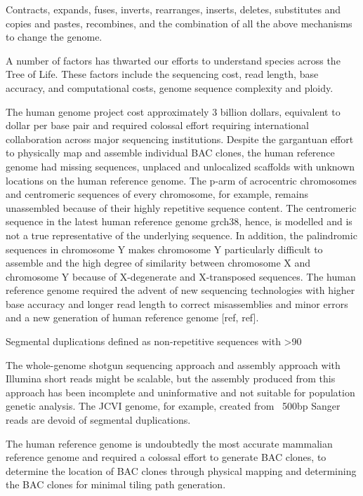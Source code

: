 Contracts, expands, fuses, inverts, rearranges, inserts, deletes, substitutes and copies and pastes, recombines, and the combination of all the above mechanisms to change the genome. 

A number of factors has thwarted our efforts to understand species across the Tree of Life. These factors include the sequencing cost, read length, base accuracy, and computational costs, genome sequence complexity and ploidy. 

The human genome project cost approximately 3 billion dollars, equivalent to dollar per base pair and required colossal effort requiring international collaboration across major sequencing institutions. Despite the gargantuan effort to physically map and assemble individual BAC clones, the human reference genome had missing sequences, unplaced and unlocalized scaffolds with unknown locations on the human reference genome. The p-arm of acrocentric chromosomes and centromeric sequences of every chromosome, for example, remains unassembled because of their highly repetitive sequence content. The centromeric sequence in the latest human reference genome grch38, hence, is modelled and is not a true representative of the underlying sequence. In addition, the palindromic sequences in chromosome Y makes chromosome Y particularly difficult to assemble and the high degree of similarity between chromosome X and chromosome Y because of X-degenerate and X-transposed sequences. The human reference genome required the advent of new sequencing technologies with higher base accuracy and longer read length to correct misassemblies and minor errors and a new generation of human reference genome [ref, ref]. 

Segmental duplications defined as non-repetitive sequences with >90%

The whole-genome shotgun sequencing approach and assembly approach with Illumina short reads might be scalable, but the assembly produced from this approach has been incomplete and uninformative and not suitable for population genetic analysis. The JCVI genome, for example, created from ~500bp Sanger reads are devoid of segmental duplications. 



The human reference genome is undoubtedly the most accurate mammalian reference genome and required a colossal effort to generate BAC clones, to determine the location of BAC clones through physical mapping and determining the BAC clones for minimal tiling path generation.

